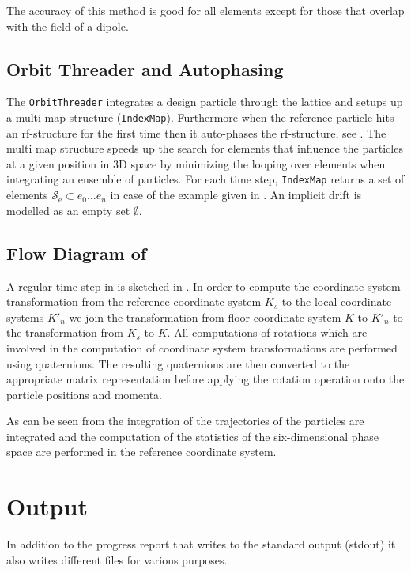 The accuracy of this method is good for all elements except for those that overlap with the field of a dipole.

\subsection{Orbit Threader and Autophasing}
\label{sec:orbitthreader}
The \texttt{OrbitThreader} integrates a design particle through the lattice and setups up a multi map structure (\texttt{IndexMap}). Furthermore when the reference particle hits an rf-structure for the first time then it auto-phases the rf-structure, see . The multi map structure speeds up the search for elements that influence the particles at a given position in 3D space by minimizing the looping over elements when integrating an ensemble of particles. For each time step, \texttt{IndexMap} returns a set of elements $\mathcal{S}_{\text{e}} \subset {e_0 \ldots e_n}$ in case of the example given in . An implicit drift is modelled as an empty set $\emptyset$.

\subsection{Flow Diagram of \opalt}

A regular time step in \opalt is sketched in . In order to compute the coordinate system transformation from the reference coordinate system $K_s$ to the local coordinate systems $K'_n$ we join the transformation from floor coordinate system $K$ to $K'_n$ to the transformation from $K_s$ to $K$. All computations of rotations which are involved in the computation of coordinate system transformations are performed using quaternions. The resulting quaternions are then converted to the appropriate matrix representation before applying the rotation operation onto the particle positions and momenta.

As can be seen from  the integration of the trajectories of the particles are integrated and the computation of the statistics of the six-dimensional phase space are performed in the reference coordinate system.

\section{Output}
In addition to the progress report that \opalt writes to the standard output (stdout) it also writes different files for various purposes.
